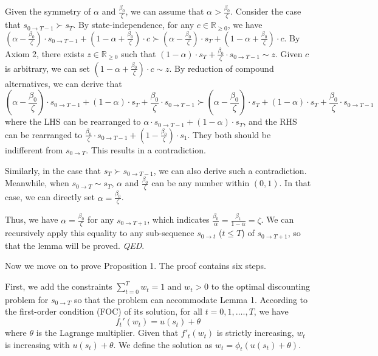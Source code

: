 Given the symmetry of \(\alpha\) and \(\frac{\beta_0}{\zeta}\), we can
assume that \(\alpha > \frac{\beta_0}{\zeta}\). Consider the case that
\(s_{0 \rightarrow T-1} \succ s_T\). By state-independence, for any
\(c\in \mathbb{R}_{\geq 0}\), we have
\((\alpha - \frac{\beta_0}{\zeta})\cdot s_{0\rightarrow T-1} + (1-\alpha+\frac{\beta_0}{\zeta})\cdot c \succ (\alpha - \frac{\beta_0}{\zeta})\cdot s_T + (1-\alpha+\frac{\beta_0}{\zeta})\cdot c\).
By Axiom 2, there exists \(z\in \mathbb{R}_{\geq 0}\) such that
\((1-\alpha)\cdot s_T + \frac{\beta_0}{\zeta}\cdot s_{0\rightarrow T-1}\sim z\).
Given \(c\) is arbitrary, we can set
\((1-\alpha+\frac{\beta_0}{\zeta})\cdot c \sim z\). By reduction of
compound alternatives, we can derive that\[
(\alpha-\frac{\beta_0}{\zeta})\cdot s_{0\rightarrow T-1} +(1-\alpha)\cdot s_T + \frac{\beta_0}{\zeta}\cdot s_{0\rightarrow T-1} \succ (\alpha-\frac{\beta_0}{\zeta})\cdot s_T +(1-\alpha)\cdot s_T + \frac{\beta_0}{\zeta}\cdot s_{0\rightarrow T-1}
\]where the LHS can be rearranged to
\(\alpha\cdot s_{0\rightarrow T-1} + (1-\alpha)\cdot s_T\), and the RHS
can be rearranged to
\(\frac{\beta_0}{\zeta}\cdot s_{0 \rightarrow T-1} + (1-\frac{\beta_0}{\zeta})\cdot s_1\).
They both should be indifferent from \(s_{0\rightarrow T}\). This
results in a contradiction.

Similarly, in the case that \(s_T \succ s_{0 \rightarrow T-1}\), we can
also derive such a contradiction. Meanwhile, when
\(s_{0\rightarrow T}\sim s_T\), \(\alpha\) and \(\frac{\beta_0}{\zeta}\)
can be any number within \((0,1)\). In that case, we can directly set
\(\alpha = \frac{\beta_0}{\zeta}\).

Thus, we have \(\alpha = \frac{\beta_0}{\zeta}\) for any
\(s_{0\rightarrow T+1}\), which indicates
\(\frac{\beta_0}{\alpha}=\frac{\beta_1}{1-\alpha}=\zeta\). We can
recursively apply this equality to any sub-sequence
\(s_{0\rightarrow t}\) (\(t\leq T\)) of \(s_{0\rightarrow T+1}\), so
that the lemma will be proved. \emph{QED}.

Now we move on to prove Proposition 1. The proof contains six steps.

First, we add the constraints \(\sum_{t=0}^T w_t=1\) and \(w_t>0\) to
the optimal discounting problem for \(s_{0\rightarrow T}\) so that the
problem can accommodate Lemma 1. According to the first-order condition
(FOC) of its solution, for all \(t=0,1,….,T\), we have\[\tag{A3}
f_t'(w_t)=u(s_t)+\theta
\]where \(\theta\) is the Lagrange multiplier. Given that \(f'_t(w_t)\)
is strictly increasing, \(w_t\) is increasing with \(u(s_t)+\theta\). We
define the solution as \(w_t =\phi_t(u(s_t)+\theta)\).

